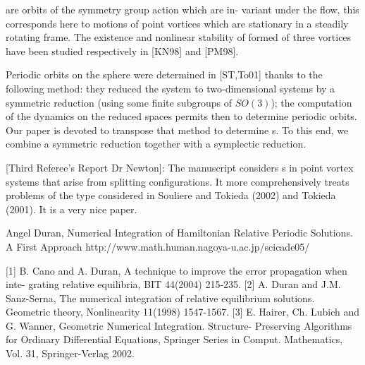     {\Reqva} are orbits of the symmetry group action which are in-
variant under the flow, this corresponds here to motions of point vortices which
are stationary in a steadily rotating frame.
 The existence and nonlinear stability
of {\reqva} formed of three vortices have been studied respectively in
[KN98] and [PM98].

Periodic orbits on the sphere were determined in [ST,To01] thanks to the
following method: they reduced the system to two-dimensional systems by a
symmetric reduction (using some finite subgroups of $SO(3)$); the computation
of the dynamics on the reduced spaces permits then to determine periodic orbits.
Our paper is devoted to transpose that method to determine {\rpo s}.
To this end, we combine a symmetric reduction together with a symplectic reduction.

[Third Referee's Report Dr Newton]:
The manuscript considers {\rpo s} in point vortex systems
that arise from splitting {\reqv} configurations. It more
comprehensively treats problems of the type considered in Souliere and
Tokieda (2002) and Tokieda (2001). It is a very nice paper.

Angel Duran,
Numerical Integration of Hamiltonian
Relative Periodic Solutions. A First Approach
http://www.math.human.nagoya-u.ac.jp/scicade05/

    [1] B. Cano and A. Duran, A technique to improve the error propagation when inte-
grating relative equilibria, BIT 44(2004) 215-235.
    [2] A. Duran and J.M. Sanz-Serna, The numerical integration of relative equilibrium
solutions. Geometric theory, Nonlinearity 11(1998) 1547-1567.
    [3] E. Hairer, Ch. Lubich and G. Wanner, Geometric Numerical Integration. Structure-
Preserving Algorithms for Ordinary Differential Equations, Springer Series in Comput.
Mathematics, Vol. 31, Springer-Verlag 2002.



